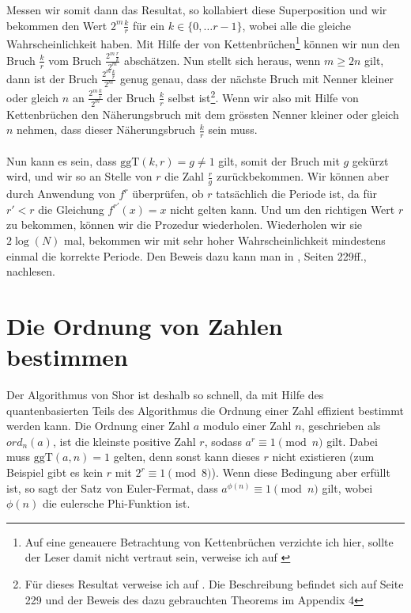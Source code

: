 Messen wir somit dann das Resultat, so kollabiert diese Superposition und wir bekommen den Wert $2^m\frac{k}{r}$ für ein $k \in \{0, \dots r - 1\}$, wobei alle die gleiche Wahrscheinlichkeit haben. Mit Hilfe der von Kettenbrüchen\footnote{Auf eine geneauere Betrachtung von Kettenbrüchen verzichte ich hier, sollte der Leser damit nicht vertraut sein, verweise ich auf \cite{Frac}} können wir nun den Bruch $\frac{k}{r}$ vom Bruch $\frac{2^m\frac{r}{k}}{2^m}$ abschätzen. Nun stellt sich heraus, wenn $m \geq 2n$ gilt, dann ist der Bruch $\frac{2^m\frac{k}{r}}{2^m}$ genug genau, dass der nächste Bruch mit Nenner kleiner oder gleich $n$ an $\frac{2^m\frac{k}{r}}{2^m}$ der Bruch $\frac{k}{r}$ selbst ist\footnote{Für dieses Resultat verweise ich auf \cite{QC}. Die Beschreibung befindet sich auf Seite 229 und der Beweis des dazu gebrauchten Theorems im Appendix 4}. Wenn wir also mit Hilfe von Kettenbrüchen den Näherungsbruch mit dem grössten Nenner kleiner oder gleich $n$ nehmen, dass dieser Näherungsbruch $\frac{k}{r}$ sein muss.
\paragraph{}
Nun kann es sein, dass $\text{ggT}(k, r) = g \neq 1$ gilt, somit der Bruch mit $g$ gekürzt wird, und wir so an Stelle von $r$ die Zahl $\frac{r}{g}$ zurückbekommen. Wir können aber durch Anwendung von $f^r$ überprüfen, ob $r$ tatsächlich die Periode ist, da für $r' < r$ die Gleichung $f^{r'}(x) = x$ nicht gelten kann. Und um den richtigen Wert $r$ zu bekommen, können wir die Prozedur wiederholen. Wiederholen wir sie $2\log(N)$ mal, bekommen wir mit sehr hoher Wahrscheinlichkeit mindestens einmal die korrekte Periode. Den Beweis dazu kann man in \cite{QC}, Seiten 229ff., nachlesen.

\section{Die Ordnung von Zahlen bestimmen}
Der Algorithmus von Shor ist deshalb so schnell, da mit Hilfe des quantenbasierten Teils des Algorithmus die Ordnung einer Zahl effizient bestimmt werden kann. Die Ordnung einer Zahl $a$ modulo einer Zahl $n$, geschrieben als $ord_n(a)$, ist die kleinste positive Zahl $r$, sodass $a^r \equiv 1 \pmod{n}$ gilt. Dabei muss $\text{ggT}(a, n) = 1$ gelten, denn sonst kann dieses $r$ nicht existieren (zum Beispiel gibt es kein $r$ mit $2^r \equiv 1 \pmod{8}$). Wenn diese Bedingung aber erfüllt ist, so sagt der Satz von Euler-Fermat, dass $a^{\phi(n)} \equiv 1 \pmod{n}$ gilt, wobei $\phi(n)$ die eulersche Phi-Funktion ist. 


